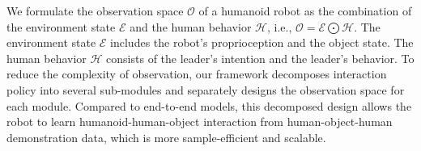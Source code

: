 
We formulate the observation space $\mathcal{O}$ of a humanoid robot as the combination of the
environment state $\mathcal{E}$ and the human behavior $\mathcal{H}$, i.e., $\mathcal{O} = \mathcal{E}  \bigodot  \mathcal{H} $.
The environment state $\mathcal{E}$ includes the robot's proprioception and the object state. The human behavior $\mathcal{H}$ consists of the leader's intention and the leader's behavior. 
To reduce the complexity of observation, our framework decomposes interaction policy into several sub-modules and separately designs the observation space for each module.
Compared to end-to-end models, this decomposed design allows the robot to learn humanoid-human-object interaction from human-object-human demonstration data, which is more sample-efficient and scalable.





